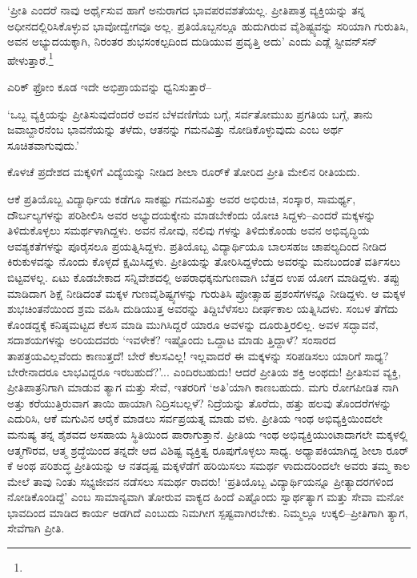 ‘ಪ್ರೀತಿ ಎಂದರೆ ನಾವು ಅರ್ಥೈಸುವ ಹಾಗೆ ಅನುರಾಗದ ಭಾವಪರವಶತೆಯಲ್ಲ. ಪ್ರೀತಿಪಾತ್ರ ವ್ಯಕ್ತಿಯನ್ನು ತನ್ನ ಅಧೀನದಲ್ಲಿರಿಸಿಕೊಳ್ಳುವ ಭಾವೋದ್ವೇಗವೂ ಅಲ್ಲ. ಪ್ರತಿಯೊಬ್ಬನಲ್ಲೂ ಹುದುಗಿರುವ ವೈಶಿಷ್ಟ್ಯವನ್ನು ಸರಿಯಾಗಿ ಗುರುತಿಸಿ, ಅವನ ಅಭ್ಯುದಯಕ್ಕಾಗಿ, ನಿರಂತರ ಶುಭಸಂಕಲ್ಪದಿಂದ ದುಡಿಯುವ ಪ್ರವೃತ್ತಿ ಅದು’ ಎಂದು ಎಡ್ಲೆ ಸ್ಟೀವನ್​ಸನ್ ಹೇಳುತ್ತಾರೆ.\footnote{\hfill{}}

ಎರಿಕ್ ಫ್ರೋಂ ಕೂಡ ಇದೇ ಅಭಿಪ್ರಾಯವನ್ನು ಧ್ವನಿಸುತ್ತಾರೆ–

‘ಒಬ್ಬ ವ್ಯಕ್ತಿಯನ್ನು ಪ್ರೀತಿಸುವುದೆಂದರೆ ಅವನ ಬೆಳವಣಿಗೆಯ ಬಗ್ಗೆ, ಸರ್ವತೋಮುಖ ಪ್ರಗತಿಯ ಬಗ್ಗೆ, ತಾನು ಜವಾಬ್ದಾರನೆಂಬ ಭಾವನೆಯನ್ನು ತಳೆದು, ಆತನನ್ನು ಗಮನವಿತ್ತು ನೋಡಿಕೊಳ್ಳುವುದು ಎಂಬ ಅರ್ಥ ಸೂಚಿತವಾಗುವುದು.’

ಕೊಳಚೆ ಪ್ರದೇಶದ ಮಕ್ಕಳಿಗೆ ವಿದ್ಯೆಯನ್ನು ನೀಡಿದ ಶೀಲಾ ರೂರ್​ಕೆ ತೋರಿದ ಪ್ರೀತಿ ಮೇಲಿನ ರೀತಿಯದು.

ಆಕೆ ಪ್ರತಿಯೊಬ್ಬ ವಿದ್ಯಾರ್ಥಿಯ ಕಡೆಗೂ ಸಾಕಷ್ಟು ಗಮನವಿತ್ತು ಅವರ ಅಭಿರುಚಿ, ಸಂಸ್ಕಾರ, ಸಾಮರ್ಥ್ಯ, ದೌರ್ಬಲ್ಯಗಳನ್ನು ಪರಿಶೀಲಿಸಿ ಅವರ ಅಭ್ಯುದಯಕ್ಕೇನು ಮಾಡಬೇಕೆಂದು ಯೋಚಿ ಸಿದ್ದಳು–ಎಂದರೆ ಮಕ್ಕಳನ್ನು ತಿಳಿದುಕೊಳ್ಳಲು ಸಮರ್ಥಳಾಗಿದ್ದಳು. ಅವನ ನೋವು, ನಲಿವು ಗಳನ್ನು ತಿಳಿದುಕೊಂಡು ಅವನ ಅಭಿವೃದ್ಧಿಯ ಆವಶ್ಯಕತೆಗಳನ್ನು ಪೂರೈಸಲೂ ಪ್ರಯತ್ನಿಸಿದ್ದಳು. ಪ್ರತಿಯೊಬ್ಬ ವಿದ್ಯಾರ್ಥಿಯೂ ಬಾಲಸಹಜ ಚಾಪಲ್ಯದಿಂದ ನೀಡಿದ ಕಿರುಕುಳವನ್ನು ನೊಂದು ಕೊಳ್ಳದೆ ಕ್ಷಮಿಸಿದ್ದಳು. ಪ್ರೀತಿಯನ್ನು ತೋರಿಸಿದ್ದಳೆಂದು ಅವರನ್ನು ಮನಬಂದಂತೆ ವರ್ತಿಸಲು ಬಿಟ್ಟವಳಲ್ಲ. ಏಟು ಕೊಡಬೇಕಾದ ಸನ್ನಿವೇಶದಲ್ಲಿ ಅಪರಾಧಕ್ಕನುಗುಣವಾಗಿ ಬೆತ್ತದ ಉಪ ಯೋಗ ಮಾಡಿದ್ದಳು. ತಪ್ಪು ಮಾಡಿದಾಗ ಶಿಕ್ಷೆ ನೀಡಿದಂತೆ ಮಕ್ಕಳ ಗುಣವೈಶಿಷ್ಟ್ಯಗಳನ್ನು ಗುರುತಿಸಿ ಪ್ರೋತ್ಸಾಹ ಪ್ರಶಂಸೆಗಳನ್ನೂ ನೀಡಿದ್ದಳು. ಆ ಮಕ್ಕಳ ಶುಭಚಿಂತನೆಯಿಂದ ಶ್ರಮ ವಹಿಸಿ ದುಡಿಯುತ್ತ ಅವರನ್ನು ತಿದ್ದಿಬೆಳೆಸಲು ದೀರ್ಘಕಾಲ ಯತ್ನಿಸಿದಳು. ಸಂಬಳ ತೆಗೆದು ಕೊಂಡದ್ದಕ್ಕೆ ಕನಿಷ್ಠಮಟ್ಟದ ಕೆಲಸ ಮಾಡಿ ಮುಗಿಸಿದ್ದರೆ ಯಾರೂ ಅವಳನ್ನು ದೂರುತ್ತಿರಲಿಲ್ಲ. ಅವಳ ಸದ್ಭಾವನೆ, ಸದಾಶಯಗಳನ್ನು ಅರಿಯದವರು ‘ಇವಳೇಕೆ? ಇಷ್ಟೊಂದು ಒದ್ದಾಟ ಮಾಡು ತ್ತಿದ್ದಾಳೆ? ಸಂಸಾರದ ತಾಪತ್ರಯವಿಲ್ಲವೆಂದು ಕಾಣುತ್ತದೆ! ಬೇರೆ ಕೆಲಸವಿಲ್ಲ! ಇಲ್ಲವಾದರೆ ಈ ಮಕ್ಕಳನ್ನು ಸರಿಪಡಿಸಲು ಯಾರಿಗೆ ಸಾಧ್ಯ? ಬೇರೇನಾದರೂ ಲಾಭವಿದ್ದರೂ ಇರಬಹುದೆ?’... ಎಂದಿರಬಹುದು! ಆದರೆ ಪ್ರೀತಿಯ ಶಕ್ತಿ ಅಂಥದು! ಪ್ರೀತಿಸುವ ವ್ಯಕ್ತಿ, ಪ್ರೀತಿಪಾತ್ರನಿಗಾಗಿ ಮಾಡುವ ತ್ಯಾಗ ಮತ್ತು ಸೇವೆ, ಇತರರಿಗೆ ‘ಅತಿ’ಯಾಗಿ ಕಾಣಬಹುದು. ಮಗು ರೋಗಪೀಡಿತ ನಾಗಿ ಅತ್ತು ಕರೆಯುತ್ತಿರುವಾಗ ತಾಯಿ ಹಾಯಾಗಿ ನಿದ್ರಿಸಬಲ್ಲಳೆ? ನಿದ್ರೆಯನ್ನು ತೊರೆದು, ಹತ್ತು ಹಲವು ತೊಂದರೆಗಳನ್ನು ಎದುರಿಸಿ, ಆಕೆ ಮಗುವಿನ ಆರೈಕೆ ಮಾಡಲು ಸರ್ವಪ್ರಯತ್ನ ಮಾಡು ವಳು. ಪ್ರೀತಿಯ ಇಂಥ ಅಭಿವ್ಯಕ್ತಿಯಿಂದಲೇ ಮನುಷ್ಯ ತನ್ನ ಶೈಶವದ ಅಸಹಾಯ ಸ್ಥಿತಿಯಿಂದ ಪಾರಾಗುತ್ತಾನೆ. ಪ್ರೀತಿಯ ಇಂಥ ಅಭಿವ್ಯಕ್ತಿಯುಂಟಾದಾಗಲೇ ಮಕ್ಕಳಲ್ಲಿ ಆತ್ಮಗೌರವ, ಆತ್ಮ ಶ್ರದ್ಧೆಯಿಂದ ತನ್ನದೇ ಆದ ವಿಶಿಷ್ಟ ವ್ಯಕ್ತಿತ್ವ ರೂಪುಗೊಳ್ಳಲು ಸಾಧ್ಯ. ಅಧ್ಯಾಪಕಿಯಾಗಿದ್ದ ಶೀಲಾ ರೂರ್​ಕೆ ಅಂಥ ಪರಿಶುದ್ಧ ಪ್ರೀತಿಯನ್ನು ಆ ನತದೃಷ್ಟ ಮಕ್ಕಳೆಡೆಗೆ ಹರಿಯಿಸಲು ಸಮರ್ಥ ಳಾದುದರಿಂದಲೇ ಅವರು ತಮ್ಮ ಕಾಲ ಮೇಲೆ ತಾವು ನಿಂತು ಸಭ್ಯಜೀವನ ನಡೆಸಲು ಸಮರ್ಥ ರಾದರು! ‘ಪ್ರತಿಯೊಬ್ಬ ವಿದ್ಯಾರ್ಥಿಯನ್ನೂ ಪ್ರೀತ್ಯಾದರಗಳಿಂದ ನೋಡಿಕೊಂಡಿದ್ದೆ’ ಎಂಬ ಸಾಮಾನ್ಯವಾಗಿ ತೋರುವ ವಾಕ್ಯದ ಹಿಂದೆ ಎಷ್ಟೊಂದು ಸ್ವಾರ್ಥತ್ಯಾಗ ಮತ್ತು ಸೇವಾ ಮನೋ ಭಾವದಿಂದ ಮಾಡಿದ ಕಾರ್ಯ ಅಡಗಿದೆ ಎಂಬುದು ನಿಮಗೀಗ ಸ್ಪಷ್ಟವಾಗಿರಬೇಕು. ನಿಮ್ಮಲ್ಲೂ ಉಕ್ಕಲಿ–ಪ್ರೀತಿಗಾಗಿ ತ್ಯಾಗ, ಸೇವೆಗಾಗಿ ಪ್ರೀತಿ.


